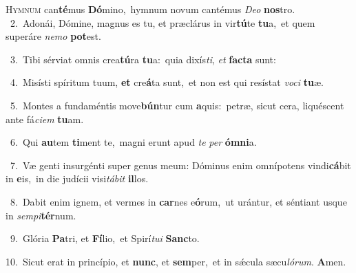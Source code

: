 \lettrine{\initial\textcolor{\initialcolor}{H}}{ymnum} can\-\textbf{té}\-mus \textbf{Dó}\-mino,~\star hymnum novum cantémus \textit{De}\-\textit{o} \textbf{nos}\-tro.\\
{\numbfont\textcolor{\numbcolor}{~2.}}~Adonái, Dómine, magnus es tu, et præclárus in vir\-\textbf{tú}\-te \textbf{tu}\-a,~\star et quem superáre \textit{ne}\-\textit{mo} \textbf{pot}\-est.\par
{\numbfont\textcolor{\numbcolor}{~3.}}~Tibi sérviat omnis crea\-\textbf{tú}\-ra \textbf{tu}\-a:~\star quia dixís\-\textit{ti}\-, \textit{et} \textbf{fac}\-\textbf{ta} sunt:\par
{\numbfont\textcolor{\numbcolor}{~4.}}~Misísti spíritum tuum, \textbf{et} cre\-\textbf{á}\-ta sunt,~\star et non est qui resístat \textit{vo}\-\textit{ci} \textbf{tu}\-æ.\par
{\numbfont\textcolor{\numbcolor}{~5.}}~Montes a fundaméntis move\-\textbf{bún}\-tur cum \textbf{a}\-quis:~\star petræ, sicut cera, liquéscent ante fá\-\textit{ci}\-\textit{em} \textbf{tu}\-am.\par
{\numbfont\textcolor{\numbcolor}{~6.}}~Qui \textbf{au}\-tem \textbf{ti}\-ment te,~\star magni erunt apud \textit{te} \textit{per} \textbf{óm}\-\textbf{ni}a.\par
{\numbfont\textcolor{\numbcolor}{~7.}}~Væ genti insurgénti super genus meum: Dóminus enim omnípotens vindi\-\textbf{cá}\-bit in \textbf{e}\-is,~\star in die judícii visi\-\textit{tá}\-\textit{bit} \textbf{il}\-los.\par
{\numbfont\textcolor{\numbcolor}{~8.}}~Dabit enim ignem, et vermes in \textbf{car}\-nes e\-\textbf{ó}\-rum,~\star ut urántur, et séntiant usque in \textit{sem}\-\textit{pi}\textbf{tér}num.\par
{\numbfont\textcolor{\numbcolor}{~9.}}~Glória \textbf{Pa}\-tri, et \textbf{Fí}\-lio,~\star et Spirí\-\textit{tu}\-\textit{i} \textbf{Sanc}\-to.\par
{\numbfont\textcolor{\numbcolor}{10.}}~Sicut erat in princípio, et \textbf{nunc}\-, et \textbf{sem}\-per,~\star et in sǽcula sæcu\-\textit{ló}\-\textit{rum}. \textbf{A}\-men.\par
